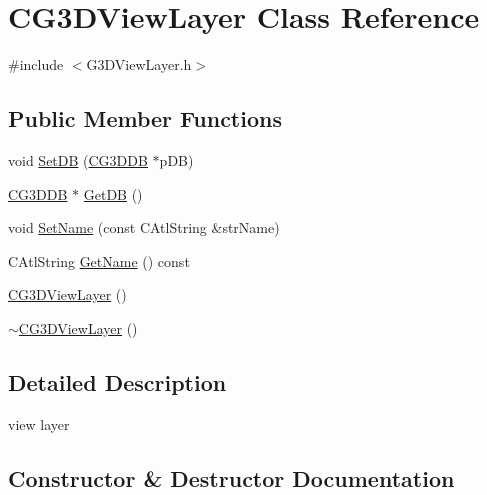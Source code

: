 \hypertarget{class_c_g3_d_view_layer}{}\section{C\+G3\+D\+View\+Layer Class Reference}
\label{class_c_g3_d_view_layer}


{\ttfamily \#include $<$G3\+D\+View\+Layer.\+h$>$}

\subsection*{Public Member Functions}
\begin{DoxyCompactItemize}
\item 
void \hyperlink{class_c_g3_d_view_layer_aa593814737fed8708b18dd0c4ebdf2ec}{Set\+D\+B} (\hyperlink{class_c_g3_d_d_b}{C\+G3\+D\+D\+B} $\ast$p\+D\+B)
\item 
\hyperlink{class_c_g3_d_d_b}{C\+G3\+D\+D\+B} $\ast$ \hyperlink{class_c_g3_d_view_layer_aa3d6b374639eb1c3540db899e9a23120}{Get\+D\+B} ()
\item 
void \hyperlink{class_c_g3_d_view_layer_affea7a40509469282a40fcc8165202a4}{Set\+Name} (const C\+Atl\+String \&str\+Name)
\item 
C\+Atl\+String \hyperlink{class_c_g3_d_view_layer_a341d16632527b395dfc7b0338ccdfd72}{Get\+Name} () const 
\item 
\hyperlink{class_c_g3_d_view_layer_a999723e52635a72138e03ce6b2ca4894}{C\+G3\+D\+View\+Layer} ()
\item 
\hyperlink{class_c_g3_d_view_layer_ac56ffb5ebdfe18c868263cc457728a58}{$\sim$\+C\+G3\+D\+View\+Layer} ()
\end{DoxyCompactItemize}


\subsection{Detailed Description}

\begin{DoxyItemize}
\item view layer 
\end{DoxyItemize}

\subsection{Constructor \& Destructor Documentation}
\hypertarget{class_c_g3_d_view_layer_a999723e52635a72138e03ce6b2ca4894}{}
